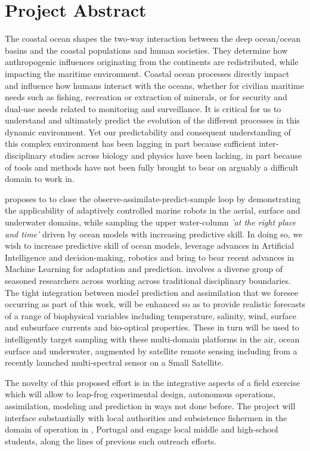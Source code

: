 \section*{Project Abstract}
\label{sec:abs}

The coastal ocean shapes the two-way interaction between the deep
ocean/ocean basins and the coastal populations and human societies. They
determine how anthropogenic influences originating from the continents
are redistributed, while impacting the maritime environment. Coastal
ocean processes directly impact and influence how humans interact with
the oceans, whether for civilian maritime needs such as fishing,
recreation or extraction of minerals, or for security and dual-use needs
related to monitoring and surveillance. It is critical for us to
understand and ultimately predict the evolution of the different
processes in this dynamic environment. Yet our predictability and
consequent understanding of this complex environment has been lagging in
part because sufficient inter-disciplinary studies across biology and
physics have been lacking, in part because of tools and methods have not
been fully brought to bear on arguably a difficult domain to work in.

\proj proposes to to close the observe-assimilate-predict-sample loop by
demonstrating the applicability of adaptively controlled marine robots
in the aerial, surface and underwater domains, while sampling the upper
water-column \emph{'at
  the right place and time'} driven by ocean models with increasing
predictive skill. In doing so, we wish to increase predictive skill of
ocean models, leverage advances in Artificial Intelligence and
decision-making, robotics and bring to bear recent advances in Machine
Learning for adaptation and prediction. \proj involves a diverse group
of seasoned researchers across working across traditional disciplinary
boundaries. The tight integration between model prediction and
assimilation that we foresee occurring as part of this work, will be
enhanced so as to provide realistic forecasts of a range of biophysical
variables including temperature, salinity, wind, surface and subsurface
currents and bio-optical properties. These in turn will be used to
intelligently target sampling with these multi-domain platforms in the
air, ocean surface and underwater, augmented by satellite remote sensing
including from a recently launched multi-spectral sensor on a Small
Satellite.

The novelty of this proposed effort is in the integrative aspects of a
field exercise which will allow \proj to leap-frog experimental design,
autonomous operations, assimilation, modeling and prediction in ways not
done before. The project will interface substantially with local
authorities and subsistence fishermen in the domain of operation in
\naze, Portugal and engage local middle and high-school students, along
the lines of previous such outreach efforts. 